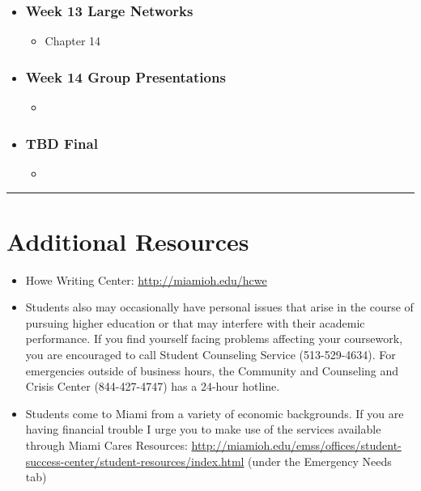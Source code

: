 \documentclass[11pt]{article}
\newenvironment{courseday}[2]{
\begin{itemize}
	\item[] \subsubsection*{\textbf{#1} #2}
	\begin{itemize}
}{
\end{itemize}
\end{itemize}
}
\begin{document}
\begin{courseday}{Week 13}{Large Networks}
	\item[] Chapter 14
\end{courseday}

\begin{courseday}{Week 14}{Group Presentations}
	\item[] 

\end{courseday}


\begin{courseday}{TBD}{Final}
	\item[]
\end{courseday}

\hrule
\vspace{.25cm}
\section*{\textbf{Additional Resources} }
\begin{itemize}
	\item Howe Writing Center: \url{http://miamioh.edu/hcwe}
	\item Students also may occasionally have personal issues that arise in the course of pursuing higher education or that may interfere with their academic performance. If you find yourself facing problems affecting your coursework, you are encouraged to call Student Counseling Service (513-529-4634). For emergencies outside of business hours, the Community and Counseling and Crisis Center (844-427-4747) has a 24-hour hotline. 
	\item Students come to Miami from a variety of economic backgrounds. If you are having financial trouble I urge you to make use of the services available through Miami Cares Resources: \url{http://miamioh.edu/emss/offices/student-success-center/student-resources/index.html} (under the Emergency Needs tab)
	
\end{itemize}
\end{document}
